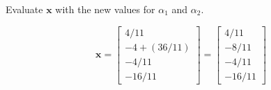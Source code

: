 Evaluate $\mathbf{x}$ with the new values for $\alpha_1$ and $\alpha_2$.

\begin{equation*}
 \mathbf{x} = \begin{bmatrix}
4/11\\
-4+(36/11)\\
-4/11\\
-16/11
              \end{bmatrix}
=
\begin{bmatrix}
 4/11\\
-8/11\\
-4/11\\
-16/11
\end{bmatrix}
\end{equation*}
